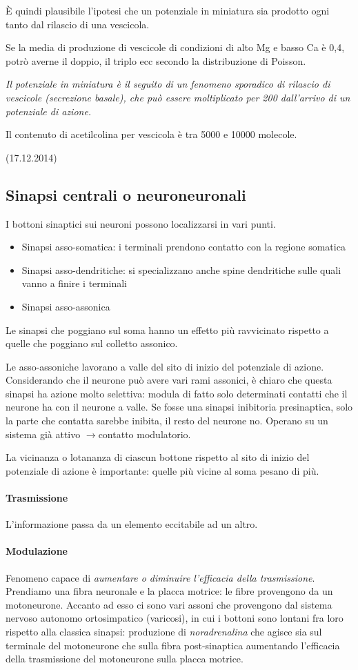 \documentclass[a4paper,12pt]{article}
\newcommand{\lfreccia}{\ensuremath{\longrightarrow}}
\begin{document}
È quindi plausibile l'ipotesi che un potenziale in miniatura sia prodotto ogni tanto dal rilascio di una vescicola.

Se la media di produzione di vescicole di condizioni di alto Mg e basso Ca è 0,4, potrò averne il doppio, il triplo ecc secondo la distribuzione di Poisson.

\emph{Il potenziale in miniatura è il seguito di un fenomeno sporadico di rilascio di vescicole (secrezione basale), che può essere moltiplicato per 200 dall'arrivo di un potenziale di azione.}

Il contenuto di acetilcolina per vescicola è tra 5000 e 10000 molecole.

(17.12.2014)

\subsection{Sinapsi centrali o neuroneuronali}
I bottoni sinaptici sui neuroni possono localizzarsi in vari punti.
\begin{itemize}
\item{Sinapsi asso-somatica: i terminali prendono contatto con la regione somatica}
\item{Sinapsi asso-dendritiche: si specializzano anche spine dendritiche sulle quali vanno a finire i terminali}
\item{Sinapsi asso-assonica}
\end{itemize}

Le sinapsi che poggiano sul soma hanno un effetto più ravvicinato rispetto a quelle che poggiano sul colletto assonico. 

Le asso-assoniche lavorano a valle del sito di inizio del potenziale di azione. Considerando che il neurone può avere vari rami assonici, è chiaro che questa sinapsi ha azione molto selettiva: modula di fatto solo determinati contatti che il neurone ha con il neurone a valle. Se fosse una sinapsi inibitoria presinaptica, solo la parte che contatta sarebbe inibita, il resto del neurone no. Operano su un sistema già attivo \lfreccia contatto modulatorio.

La vicinanza o lotananza di ciascun bottone rispetto al sito di inizio del potenziale di azione è importante: quelle più vicine al soma pesano di più.
\paragraph{Trasmissione}
L'informazione passa da un elemento eccitabile ad un altro.
\paragraph{Modulazione}
Fenomeno capace di \emph{aumentare o diminuire l'efficacia della trasmissione}. Prendiamo una fibra neuronale e la placca motrice: le fibre provengono da un motoneurone. Accanto ad esso ci sono vari assoni che provengono dal sistema nervoso autonomo ortosimpatico (varicosi), in cui i bottoni sono lontani fra loro rispetto alla classica sinapsi: produzione di \emph{noradrenalina} che agisce sia sul terminale del motoneurone che sulla fibra post-sinaptica aumentando l'efficacia della trasmissione del motoneurone sulla placca motrice.
\end{document}
